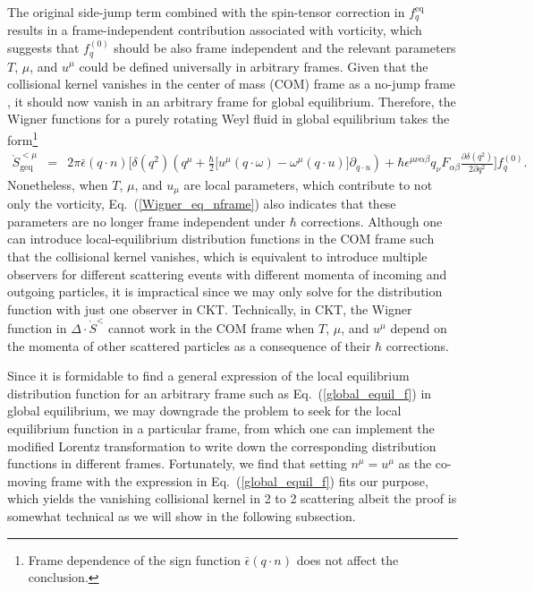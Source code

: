 \documentclass[aps,prd,showkeys,preprint,amsmath,amssymb,nofootinbib]{revtex4-1}
\begin{document}
The original side-jump term combined with the spin-tensor correction in $f^{\text{eq}}_q$ results in a frame-independent contribution associated with vorticity, which suggests that $f^{(0)}_q$ should be also frame independent and the relevant parameters $T$, $\mu$, and $u^{\mu}$ could be defined universally in arbitrary frames. Given that the collisional kernel vanishes in the center of mass (COM) frame as a no-jump frame \cite{Chen:2015gta,Hidaka:2016yjf}, it should now vanish in an arbitrary frame for global equilibrium. Therefore, the Wigner functions for a purely rotating Weyl fluid in global equilibrium takes the form\footnote{Frame dependence of the sign function $\bar{\epsilon}(q\cdot n)$ does not affect the conclusion.}    
\begin{eqnarray}
\grave{S}^{<\mu}_{\text{geq}}&=&2\pi\bar{\epsilon}(q\cdot n)\Bigg[
\delta(q^2)\left(q^{\mu}+\frac{\hbar}{2}\big[u^{\mu}(q\cdot\omega)-\omega^{\mu}(q\cdot u)\big]\partial_{q\cdot u}\right)
+\hbar\epsilon^{\mu\nu\alpha\beta}q_{\nu}F_{\alpha\beta}\frac{\partial\delta(q^2)}{2\partial q^2}
\Bigg]f^{(0)}_q.
\end{eqnarray}
Nonetheless, when $T$, $\mu$, and $u_{\mu}$ are local parameters, which contribute to not only the vorticity, Eq.~(\ref{Wigner_eq_nframe}) also indicates that these parameters are no longer frame independent under $\hbar$ corrections. Although one can introduce local-equilibrium distribution functions in the COM frame such that the collisional kernel vanishes, which is equivalent to introduce multiple observers for different scattering events with different momenta of incoming and outgoing particles, it is impractical since we may only solve for the distribution function with just one observer in CKT. Technically, in CKT, the Wigner function in $\Delta\cdot\grave{S}^<$ cannot work in the COM frame when $T$, $\mu$, and $u^{\mu}$ depend on the momenta of other scattered particles as a consequence of their $\hbar$ corrections.

Since it is formidable to find a general expression of the local equilibrium distribution function for an arbitrary frame such as Eq.~(\ref{global_equil_f}) in global equilibrium, we may downgrade the problem to seek for the local equilibrium function in a particular frame, from which one can implement the modified Lorentz transformation to write down the corresponding distribution functions in different frames. Fortunately, we find that setting $n^{\mu}=u^{\mu}$ as the co-moving frame with the expression in Eq.~(\ref{global_equil_f}) fits our purpose, which yields the vanishing collisional kernel in 2 to 2 scattering albeit the proof is somewhat technical as we will show in the following subsection.   
\end{document}
